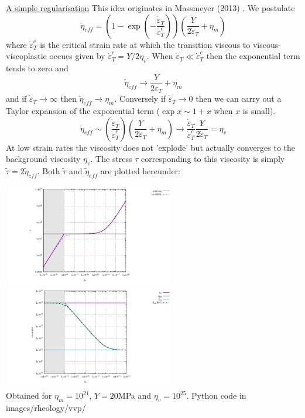 \begin{itemize}
\underline{A simple regularisation} This idea originates in Massmeyer \etal (2013) \cite{madd13}. We postulate
\[
\tilde{\eta}_{eff} = \left(  1 - \exp (- \frac{\dot\varepsilon_T}{\dot\varepsilon_{T}^c}) \right)
\left( \frac{Y}{2 \dot\varepsilon_T} + \eta_m \right)
\]
where $\dot\varepsilon_{T}^c$ is the critical strain  rate at which the transition viscous to 
viscous-viscoplastic occues given by $\dot\varepsilon_{T}^c=Y/2\eta_v$.
When $\dot\varepsilon_{T} \ll \dot\varepsilon_{T}^c$ then the exponential term tends to zero and 
\[
\tilde{\eta}_{eff} \rightarrow  \frac{Y}{2 \dot\varepsilon_T} + \eta_m 
\]
and if $\dot\varepsilon_{T} \rightarrow \infty$ then $\tilde{\eta}_{eff}\rightarrow \eta_m$.
Conversely if $\dot\varepsilon_T \rightarrow 0$ then we can carry out a Taylor expansion of the exponential 
term ($\exp x \sim 1 + x$ when $x$ is small).
\[
\tilde{\eta}_{eff} \sim \left(  \frac{\dot\varepsilon_T}{\dot\varepsilon_{T}^c} \right)
\left( \frac{Y}{2 \dot\varepsilon_T} + \eta_m \right)
\rightarrow 
\frac{\dot\varepsilon_T}{\dot\varepsilon_{T}^c}  \frac{Y}{2 \dot\varepsilon_T}  = \eta_v
\]
At low strain rates the viscosity does not 'explode' but actually converges to the background viscosity $\eta_v$.
The stress $\tau$ corresponding to this viscosity is simply $\tilde{\tau} = 2 \tilde{\eta}_{eff}$. 
Both $\tilde{\tau}$ and $ \tilde{\eta}_{eff}$ are plotted hereunder:


\begin{center}
\includegraphics[width=7.5cm]{images/rheology/vvp/tau_reg.pdf}
\includegraphics[width=7.5cm]{images/rheology/vvp/viscosities_reg.pdf}\\
{\captionfont Obtained for $\eta_m=10^{21}$, $Y=20$MPa and $\eta_v=10^{25}$. Python code 
in images/rheology/vvp/}
\end{center}



\end{itemize}
